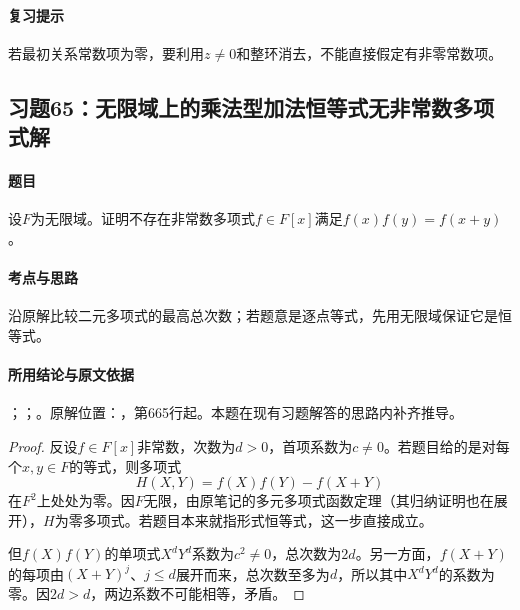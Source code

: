 \paragraph{复习提示}

若最初关系常数项为零，要利用$z\ne0$和整环消去，不能直接假定有非零常数项。



\subsection{习题65：无限域上的乘法型加法恒等式无非常数多项式解}

\label{ex:3:65}

\paragraph{题目}

设$F$为无限域。证明不存在非常数多项式$f\in F[x]$满足$f(x)f(y)=f(x+y)$。

\paragraph{考点与思路}

沿原解比较二元多项式的最高总次数；若题意是逐点等式，先用无限域保证它是恒等式。

\paragraph{所用结论与原文依据}

；；。原解位置：，第665行起。本题在现有习题解答的思路内补齐推导。


\begin{proof}

反设$f\in F[x]$非常数，次数为$d>0$，首项系数为$c\ne0$。若题目给的是对每个$x,y\in F$的等式，则多项式
\[
H(X,Y)=f(X)f(Y)-f(X+Y)
\]
在$F^2$上处处为零。因$F$无限，由原笔记的多元多项式函数定理（其归纳证明也在展开），$H$为零多项式。若题目本来就指形式恒等式，这一步直接成立。

但$f(X)f(Y)$的单项式$X^dY^d$系数为$c^2\ne0$，总次数为$2d$。另一方面，$f(X+Y)$的每项由$(X+Y)^j$、$j\le d$展开而来，总次数至多为$d$，所以其中$X^dY^d$的系数为零。因$2d>d$，两边系数不可能相等，矛盾。

\end{proof}

